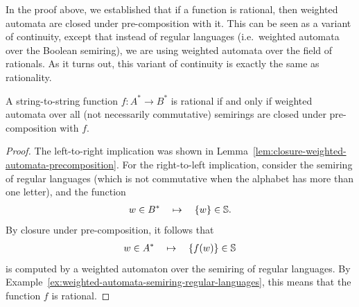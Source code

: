 In the proof above, we established that if a function is rational, then weighted automata are closed under pre-composition with it. This can be seen as a variant of continuity, except that instead of regular languages  (i.e.~weighted automata over the Boolean semiring), we are using weighted automata over the field of rationals. As it turns out, this variant of continuity is exactly the same as rationality.
\begin{theorem}\label{thm:characterisation-rational-functions-weighted-automata}
    A string-to-string function $f : A^* \to B^*$ is rational if and only if weighted automata over all (not necessarily commutative) semirings are closed under pre-composition with $f$.
\end{theorem}
\begin{proof}
    The left-to-right implication was shown in Lemma~\ref{lem:closure-weighted-automata-precomposition}. For the right-to-left implication, consider the semiring of regular languages (which is not commutative when the alphabet has more than one letter), and the  function 
    \begin{align*}
    w \in  B^*  \quad \mapsto \quad \{w\} \in \mathbb S.
    \end{align*}
    By closure under pre-composition, it follows that 
    \begin{align*}
    w \in A^* \quad \mapsto \quad \{f(w)\} \in \mathbb S
    \end{align*}
    is computed by a weighted automaton over the semiring of regular languages. By Example~\ref{ex:weighted-automata-semiring-regular-languages}, this means that the function $f$ is rational.
\end{proof}

